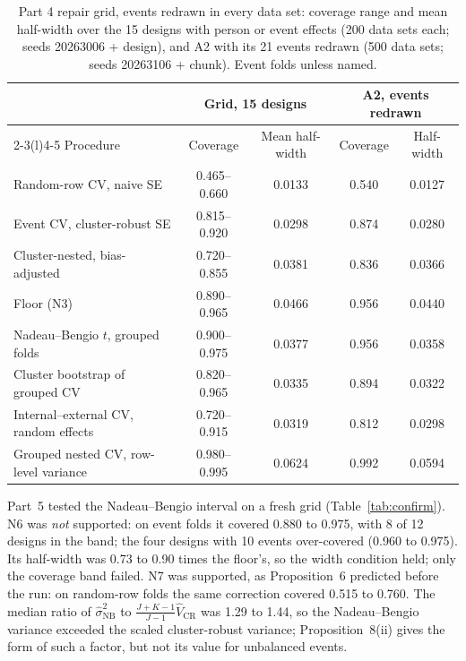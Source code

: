 \documentclass[11pt]{amsart}
\theoremstyle{plain}
\theoremstyle{definition}
\theoremstyle{remark}
\newcommand{\VCR}{\hat V_{\mathrm{CR}}}
\newcommand{\VNB}{\hat\sigma^2_{\mathrm{NB}}}
\newcommand{\fac}{\tfrac{J+K-1}{J-1}}
\begin{document}
\begin{table}[tbp]
\centering\footnotesize
\caption{Part 4 repair grid, events redrawn in every data set: coverage range and mean half-width over the 15 designs with person or event effects (200 data sets each; seeds 20263006 + design), and A2 with its 21 events redrawn (500 data sets; seeds 20263106 + chunk). Event folds unless named.}\label{tab:repair}
\begin{tabular}{@{}l c c c c@{}}
\toprule
 & \multicolumn{2}{c}{Grid, 15 designs} & \multicolumn{2}{c}{A2, events redrawn}\\
\cmidrule(lr){2-3}\cmidrule(l){4-5}
Procedure & Coverage & Mean half-width & Coverage & Half-width\\
\midrule
Random-row CV, naive SE & 0.465--0.660 & 0.0133 & 0.540 & 0.0127 \\
Event CV, cluster-robust SE & 0.815--0.920 & 0.0298 & 0.874 & 0.0280 \\
Cluster-nested, bias-adjusted & 0.720--0.855 & 0.0381 & 0.836 & 0.0366 \\
Floor (N3) & 0.890--0.965 & 0.0466 & 0.956 & 0.0440 \\
Nadeau--Bengio $t$, grouped folds & 0.900--0.975 & 0.0377 & 0.956 & 0.0358 \\
Cluster bootstrap of grouped CV & 0.820--0.965 & 0.0335 & 0.894 & 0.0322 \\
Internal--external CV, random effects & 0.720--0.915 & 0.0319 & 0.812 & 0.0298 \\
Grouped nested CV, row-level variance & 0.980--0.995 & 0.0624 & 0.992 & 0.0594 \\
\bottomrule
\end{tabular}
\end{table}

Part~5 tested the Nadeau--Bengio interval on a fresh grid (Table~\ref{tab:confirm}). N6 was \emph{not} supported: on event folds it covered 0.880 to 0.975, with 8 of 12 designs in the band; the four designs with 10 events over-covered (0.960 to 0.975). Its half-width was 0.73 to 0.90 times the floor's, so the width condition held; only the coverage band failed. N7 was supported, as Proposition~6 predicted before the run: on random-row folds the same correction covered 0.515 to 0.760. The median ratio of $\VNB$ to $\fac\VCR$ was 1.29 to 1.44, so the Nadeau--Bengio variance exceeded the scaled cluster-robust variance; Proposition~8(ii) gives the form of such a factor, but not its value for unbalanced events.
\end{document}

